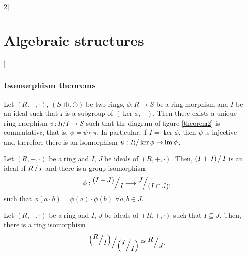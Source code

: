 \documentclass[../../../main.tex]{subfiles}
\begin{document}
\begin{multicols}{2}[\section{Algebraic structures}]
\subsubsection*{Isomorphism theorems}
\begin{theorem}
    Let $(R,+,\cdot)$, $(S,\oplus,\odot)$ be two rings, $\phi:R\rightarrow S$ be a ring morphism and $I$ be an ideal such that $I$ is a subgroup of $(\ker\phi,+)$. Then there exists a unique ring morphism $\psi:R/I\rightarrow S$ such that the diagram of figure \ref{theorem2} is commutative, that is, $\phi=\psi\circ\pi$.
    In particular, if $I=\ker\phi$, then $\psi$ is injective and therefore there is an isomorphism $\psi:R/\ker\phi\rightarrow\operatorname{im}\phi$.
\end{theorem}
\begin{theorem}
    Let $(R,+,\cdot)$ be a ring and $I$, $J$ be ideals of $(R,+,\cdot)$. Then, $\quot{(I+J)}{I}$ is an ideal of $\quot{R}{I}$ and there is a group isomorphism 
    $$\phi:\quot{(I+J)}{I}\longrightarrow\quot{J}{(I\cap J)},$$ such that $\phi(a\cdot b)=\phi(a)\cdot\phi(b)$ $\forall a,b\in J$.
\end{theorem}
\begin{theorem}
    Let $(R,+,\cdot)$ be a ring and $I$, $J$ be ideals of $(R,+,\cdot)$ such that $I\subseteq J$. Then, there is a ring isomorphism 
    $$\quot{\left(\quot{R}{I}\right)}{\left(\quot{J}{I}\right)}\cong\quot{R}{J}.$$
\end{theorem}

\end{multicols}
\end{document}
